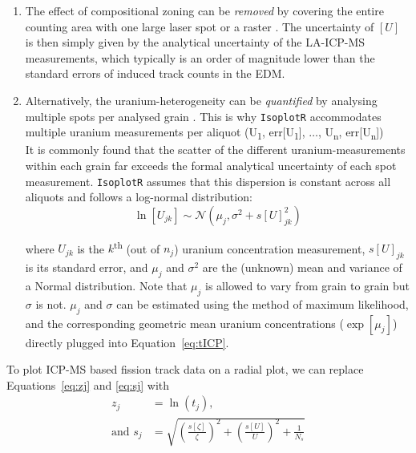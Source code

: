 \begin{refsection}
\begin{enumerate}
\item The effect of compositional zoning can be \emph{removed} by
  covering the entire counting area with one large laser spot
  \citep{soares2014} or a raster \citep{hasebe2004}. The uncertainty
  of $[{U}]$ is then simply given by the analytical uncertainty of the
  LA-ICP-MS measurements, which typically is an order of magnitude
  lower than the standard errors of induced track counts in the EDM.
\item Alternatively, the uranium-heterogeneity can be
  \emph{quantified} by analysing multiple spots per analysed grain
  \citep{hasebe2009}. This is why \texttt{IsoplotR} accommodates
  multiple uranium measurements per aliquot (U\textsubscript{1},
  err[U\textsubscript{1}], $\ldots$, U\textsubscript{n},
  err[U\textsubscript{n}])\\

  It is commonly found that the scatter of the different
  uranium-measurements within each grain far exceeds the formal
  analytical uncertainty of each spot measurement. \texttt{IsoplotR}
  assumes that this dispersion is constant across all aliquots and
  follows a log-normal distribution:
  \begin{equation}
    \ln[U_{jk}] \sim \mathcal{N}(\mu_j,\sigma^2+s[U]_{jk}^2)
    \label{eq:lognorm}
  \end{equation}

  where ${U}_{jk}$ is the $k$\textsuperscript{th} (out of $n_j$)
  uranium concentration measurement, $s[U]_{jk}$ is its standard
  error, and $\mu_j$ and $\sigma^2$ are the (unknown) mean and
  variance of a Normal distribution. Note that $\mu_j$ is allowed to
  vary from grain to grain but $\sigma$ is not.  $\mu_j$ and $\sigma$
  can be estimated using the method of maximum likelihood, and the
  corresponding geometric mean uranium concentrations ($\exp[\mu_j]$)
  directly plugged into Equation~\ref{eq:tICP}.
\end{enumerate}

To plot ICP-MS based fission track data on a radial plot, we can
replace Equations~\ref{eq:zj} and \ref{eq:sj} with
\begin{align}
  z_j & = \ln ({t}_j) \mbox{,}   \label{eq:zj2} \\
  \mbox{and~} s_j & = \sqrt{ 
    \left(\frac{s[{\zeta}]}{{\zeta}}\right)^2 +
    \left(\frac{s[{U}]}{{U}}\right)^2 +
    \frac{1}{N_s}
  }   \label{eq:sj2}
\end{align}


\end{refsection}
